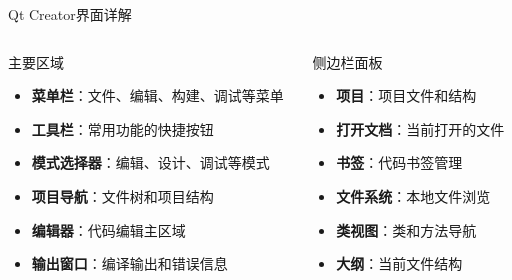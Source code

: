 \documentclass[UTF8,aspectratio=169]{beamer}
\begin{document}
\begin{frame}{Qt Creator界面详解}
    \begin{columns}
        \begin{column}{0.48\textwidth}
            \begin{ytublock}{主要区域}
                \begin{itemize}
                    \item \textbf{菜单栏}：文件、编辑、构建、调试等菜单
                    \item \textbf{工具栏}：常用功能的快捷按钮
                    \item \textbf{模式选择器}：编辑、设计、调试等模式
                    \item \textbf{项目导航}：文件树和项目结构
                    \item \textbf{编辑器}：代码编辑主区域
                    \item \textbf{输出窗口}：编译输出和错误信息
                \end{itemize}
            \end{ytublock}
        \end{column}
        \hspace{0.02\textwidth}
        \begin{column}{0.48\textwidth}
            \begin{ytublock}{侧边栏面板}
                \begin{itemize}
                    \item \textbf{项目}：项目文件和结构
                    \item \textbf{打开文档}：当前打开的文件
                    \item \textbf{书签}：代码书签管理
                    \item \textbf{文件系统}：本地文件浏览
                    \item \textbf{类视图}：类和方法导航
                    \item \textbf{大纲}：当前文件结构
                \end{itemize}
            \end{ytublock}
        \end{column}
    \end{columns}
\end{frame}
\end{document}
